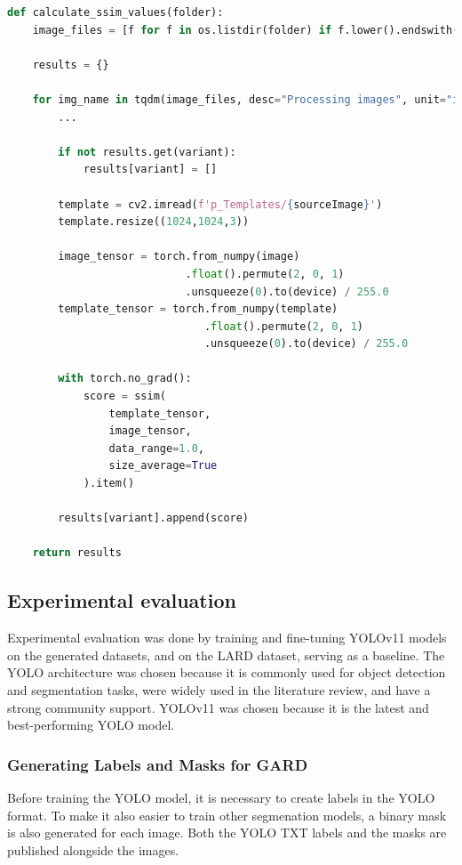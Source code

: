 \begin{lstlisting}[language=Python, caption={Evaluation, SSIM score calculation}]
def calculate_ssim_values(folder):
    image_files = [f for f in os.listdir(folder) if f.lower().endswith(".png") and not f.lower().endswith(".mask.png")]

    results = {}
    
    for img_name in tqdm(image_files, desc="Processing images", unit="img"):
        ...

        if not results.get(variant):
            results[variant] = []

        template = cv2.imread(f'p_Templates/{sourceImage}')
        template.resize((1024,1024,3))

        image_tensor = torch.from_numpy(image)
                            .float().permute(2, 0, 1)
                            .unsqueeze(0).to(device) / 255.0
        template_tensor = torch.from_numpy(template)
                               .float().permute(2, 0, 1)
                               .unsqueeze(0).to(device) / 255.0

        with torch.no_grad():
            score = ssim(
                template_tensor,
                image_tensor,
                data_range=1.0,
                size_average=True
            ).item()

        results[variant].append(score)

    return results
\end{lstlisting}

\subsection{Experimental evaluation}

Experimental evaluation was done by training and fine-tuning YOLOv11 models on
the generated datasets, and on the LARD dataset, serving as a baseline. The YOLO
architecture was chosen because it is commonly used for object detection and
segmentation tasks, were widely used in the literature review, and have a strong community
support. YOLOv11 was chosen because it is the latest and best-performing YOLO model.

\subsubsection{Generating Labels and Masks for GARD}

Before training the YOLO model, it is necessary to create labels in the YOLO
format. To make it also easier to train other segmenation models, a binary mask
is also generated for each image. Both the YOLO TXT labels and the masks are
published alongside the images.

